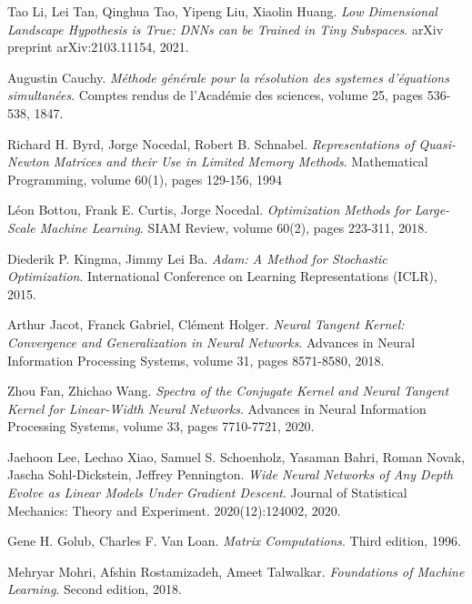 \documentclass[11pt, a4paper]{article}
\begin{document}
\pagebreak
\begin{thebibliography}{999}

 Tao Li, Lei Tan, Qinghua Tao, Yipeng Liu, Xiaolin Huang. \textit{Low Dimensional Landscape Hypothesis is True: DNNs can be Trained in Tiny Subspaces}. arXiv preprint arXiv:2103.11154, 2021.

 Augustin Cauchy. \textit{M\'{e}thode g\'{e}n\'{e}rale pour la r\'{e}solution des systemes d'\'{e}quations simultan\'{e}es}. Comptes rendus de l'Acad\'{e}mie des sciences, volume 25, pages 536-538, 1847.

 Richard H. Byrd, Jorge Nocedal, Robert B. Schnabel. \textit{Representations of Quasi-Newton Matrices and their Use in Limited Memory Methods}. Mathematical Programming, volume 60(1), pages 129-156, 1994 

 L\'{e}on Bottou, Frank E. Curtis, Jorge Nocedal. \textit{Optimization Methods for Large-Scale Machine Learning}. SIAM Review, volume 60(2), pages 223-311, 2018.

 Diederik P. Kingma, Jimmy Lei Ba. \textit{Adam: A Method for Stochastic Optimization}. International Conference on Learning Representations (ICLR), 2015.

 Arthur Jacot, Franck Gabriel, Cl\'{e}ment Holger. \textit{Neural Tangent Kernel: Convergence and Generalization in Neural Networks}. Advances in Neural Information Processing Systems, volume 31, pages 8571-8580, 2018.

 Zhou Fan, Zhichao Wang. \textit{Spectra of the Conjugate Kernel and Neural Tangent Kernel for Linear-Width Neural Networks}. Advances in Neural Information Processing Systems, volume 33, pages 7710-7721, 2020.

 Jaehoon Lee, Lechao Xiao, Samuel S. Schoenholz, Yasaman Bahri, Roman Novak, Jascha Sohl-Dickstein, Jeffrey Pennington. \textit{Wide Neural Networks of Any Depth Evolve as Linear Models Under Gradient Descent}. Journal of Statistical Mechanics: Theory and Experiment. 2020(12):124002, 2020.

 Gene H. Golub, Charles F. Van Loan. \textit{Matrix Computations}. Third edition, 1996.

 Mehryar Mohri, Afshin Rostamizadeh, Ameet Talwalkar. \textit{Foundations of Machine Learning}. Second edition, 2018.

\end{thebibliography}
\end{document}
